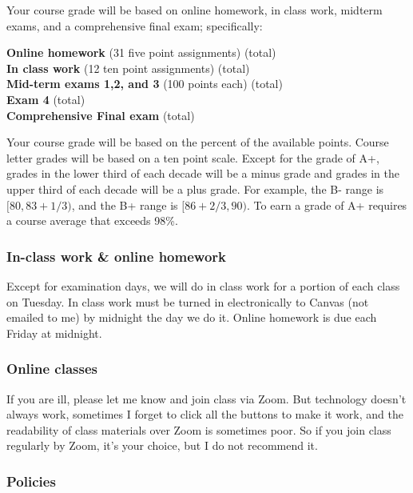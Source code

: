 \documentclass[12pt]{article}
\newcounter{ex}\setcounter{ex}{0}
\newenvironment{mypar}[2]
  {\begin{list}{}%
    {\setlength\leftmargin{#1}
    \setlength\rightmargin{#2}}
    \item[]}
  {\end{list}}
\begin{document}
Your course grade will be based on online homework, in class work, midterm exams, and a comprehensive 
final exam; specifically:
\begin{mypar}{0.25in}{0.25in}
    \textbf{Online homework} (31 five point assignments)  (total)\\
    \textbf{In class work}  (12 ten point assignments)   (total) \\
    \textbf{Mid-term exams 1,2, and 3} (100 points each)  (total)\\
    \textbf{Exam 4}  (total)\\
    \textbf{Comprehensive Final exam}  (total)\\
\end{mypar}
\noindent Your course grade will be based on the percent of the available 
points. Course letter grades will be based on a ten point scale. 
Except for the grade of A+, grades in the lower third of each decade 
will be a minus grade and grades in the upper third of each decade 
will be a plus grade. For example, the B- range is 
$[80, 83 + 1/3)$, and the B+ range is $[86 + 2/3, 90)$. To earn a 
grade of A+ requires a course average that exceeds 98\%.

\subsubsection*{In-class work \& online homework}

Except for examination days, we will do in class work for a portion 
of each class on Tuesday. In class work must be turned in 
electronically to Canvas (not emailed to me) by midnight the day we 
do it. Online homework is due each Friday at midnight. 

\subsubsection*{Online classes}

If you are ill, please let me know and join class via Zoom. But technology doesn't 
always work, sometimes I forget to click all the buttons to make it work,
and the readability of class materials over Zoom is sometimes poor. So if you 
join class regularly by Zoom, it's your choice, but I do not recommend it. 

\subsubsection* {Policies}
\end{document}
